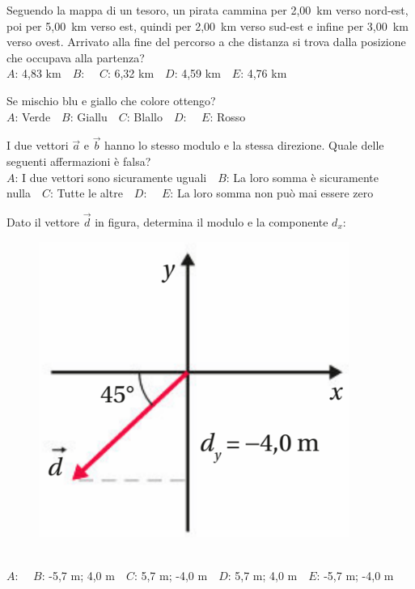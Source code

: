 \mcquestionheader Seguendo la mappa di un tesoro, un pirata cammina per 2,00~km verso nord-est, poi per 5,00~km verso est, quindi per 2,00~km verso sud-est e infine per 3,00~km verso ovest. Arrivato alla fine del percorso a che distanza si trova dalla posizione che occupava alla partenza?\\
{$A$}: 4,83 km\ \ {$B$}: \ \ {$C$}: 6,32 km\ \ {$D$}: 4,59 km\ \ {$E$}: 4,76 km\ \ 

\mcquestionfooter



\def\mcquestionnumber{2}


\mcquestionheader Se mischio blu e giallo che colore ottengo?\\
{$A$}: Verde\ \ {$B$}: Giallu\ \ {$C$}: Blallo\ \ {$D$}: \ \ {$E$}: Rosso\ \ 

\mcquestionfooter



\def\mcquestionnumber{3}


\mcquestionheader I due vettori $\vec{a}$ e $\vec{b}$ hanno lo stesso modulo e la stessa direzione. Quale delle seguenti affermazioni è falsa?\\
{$A$}: I due vettori sono sicuramente uguali\ \ {$B$}: La loro somma è sicuramente nulla\ \ {$C$}: Tutte le altre\ \ {$D$}: \ \ {$E$}: La loro somma non può mai essere zero\ \ 

\mcquestionfooter



\def\mcquestionnumber{4}


\mcquestionheader Dato il vettore $\vec{d}$ in figura, determina il modulo e la componente $d_x$: \begin{figure}[h!]   \begin{center}     \includegraphics[scale=0.35]{vettored.png}   \end{center} \end{figure}\\
{$A$}: \ \ {$B$}: -5,7 m; 4,0 m\ \ {$C$}: 5,7 m; -4,0 m\ \ {$D$}: 5,7 m; 4,0 m\ \ {$E$}: -5,7 m; -4,0 m\ \ 

